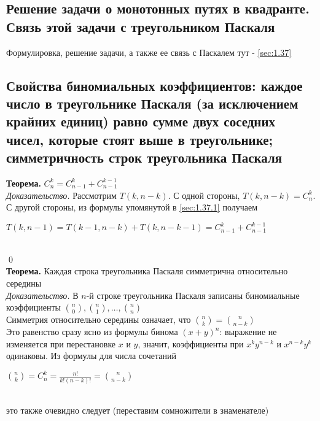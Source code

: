 \documentclass[a4paper]{article}
\begin{document}
\subsection{Решение задачи о монотонных путях в квадранте. Связь этой задачи с треугольником Паскаля}
\label{sec:2.16}Формулировка, решение задачи, а также ее связь с Паскалем тут - \ref{sec:1.37}
\subsection{Свойства биномиальных коэффициентов: каждое число в треугольнике Паскаля (за исключением крайних единиц) равно сумме двух соседних чисел, которые стоят выше в треугольнике; симметричность строк треугольника Паскаля}
\textbf{Теорема.} $C_n^k=C_{n-1}^k+C_{n-1}^{k-1}$\\[2mm]
\textit{Доказательство.} Рассмотрим $T(k,n-k)$. С одной стороны, $T(k,n-k)=C_n^k$. С другой стороны, из формулы упомянутой в \ref{sec:1.37.1} получаем\\[2mm]
\centerline{$T(k,n-1)=T(k-1,n-k)+T(k,n-k-1)=C_{n-1}^k+C_{n-1}^{k-1}$}\\[2mm]
\qed\\[2mm]
\textbf{Теорема.} Каждая строка треугольника Паскаля симметрична относительно середины\\[2mm]
\textit{Доказательство.} В $n$-й строке треугольника Паскаля записаны биномиальные коэффициенты $\binom{n}{0},\binom{n}{1},\ldots,\binom{n}{n}$\\[2mm]
 Симметрия относительно середины означает, что $\binom{n}{k}=\binom{n}{n-k}$\\[2mm]
 Это равенство сразу ясно из формулы бинома $(x+y)^n$: выражение не изменяется при перестановке $x$ и $y$, значит, коэффициенты при $x^ky^{n-k}$ и $x^{n-k}y^k$ одинаковы. Из формулы для числа сочетаний\\[2mm]
\centerline{$\binom{n}{k}=C_n^k=\frac{n!}{k!(n-k)!}=\binom{n}{n-k}$}\\[2mm]
это также очевидно следует (переставим сомножители в знаменателе)
\end{document}
